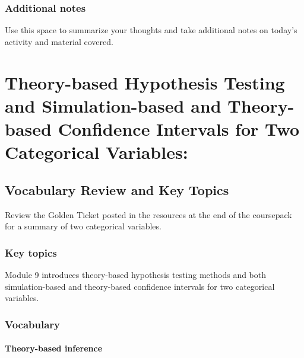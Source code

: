 \documentclass[
]{report}
\begin{document}
\subsection{Additional notes}\label{additional-notes-17}

Use this space to summarize your thoughts and take additional notes on today's activity and material covered.

\newpage

\chapter{Theory-based Hypothesis Testing and Simulation-based and Theory-based Confidence Intervals for Two Categorical Variables:}\label{theory-based-hypothesis-testing-and-simulation-based-and-theory-based-confidence-intervals-for-two-categorical-variables}

\section{Vocabulary Review and Key Topics}\label{vocabulary-review-and-key-topics-7}

Review the Golden Ticket posted in the resources at the end of the coursepack for a summary of two categorical variables.

\subsection{Key topics}\label{key-topics-8}

Module 9 introduces theory-based hypothesis testing methods and both simulation-based and theory-based confidence intervals for two categorical variables.

\subsection{Vocabulary}\label{vocabulary-7}

\subsubsection*{Theory-based inference}\label{theory-based-inference}
\end{document}
